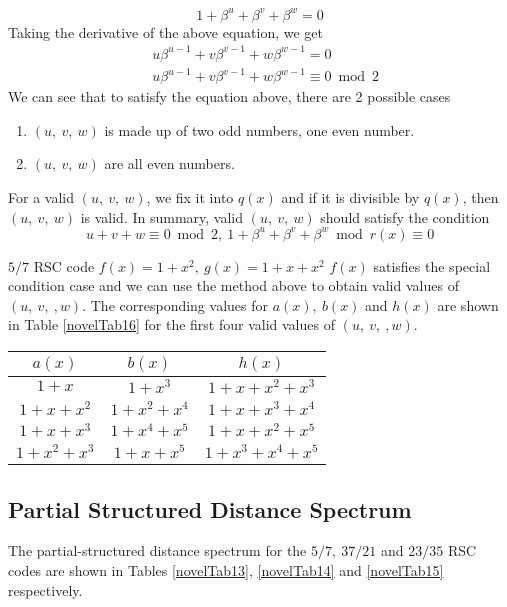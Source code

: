 $$1+\beta^{u}+\beta^{v}+\beta^{w} =0$$
Taking the derivative of the above equation, we get 
\begin{equation*}
\begin{split}
 &u\beta^{u-1}+v\beta^{v-1}+w\beta^{w-1} =0 \\
 & u\beta^{u-1}+v\beta^{v-1}+w\beta^{w-1} \equiv 0 \bmod 2
 \end{split}
 \end{equation*}
We can see that to satisfy the equation above, there are 2 possible cases
\begin{enumerate}
\item $(u,~v,~w)$ is made up of two odd numbers, one even number.
\item $(u,~v,~w)$ are all even numbers.
\end{enumerate}

For a valid $(u,~v,~w)$, we fix it into $q(x)$ and if it is divisible by $q(x)$, then $(u,~v,~w)$ is valid.
In summary, valid $(u,~v,~w)$ should satisfy the condition
$$u+v+w \equiv 0\bmod 2, ~1+\beta^{u}+\beta^{v}+\beta^{w} \bmod r(x) \equiv 0$$

\begin{example}
$5/7$ RSC code $f(x)=1+x^2,~g(x)=1+x+x^2$\newline
$f(x)$ satisfies the special condition case and we can use the method above to obtain valid values of $(u,~v,~,w)$. The corresponding values for $a(x),~b(x)$ and $h(x)$ are shown in Table \ref{novelTab16} for the first four valid values of $(u,~v,~,w)$.

 \begin{table*}[h]
 \caption{$5/7$ RSC, $f(x)=1+x^2,~w_H(\bh)=4$}
\centering
 \begin{tabular}{c c c} 
 \hline
 $a(x)$ & $b(x)$ & $h(x)$\\ [0.5ex] 
 \hline\hline
$1+x$ & $1+x^3$ & $1+x+x^2+x^3$\\ 
\hline
$1+x+x^2$ &  $1+x^2+x^4$ & $1+x+x^3+x^4$ \\
\hline
$1+x+x^3$ & $1+x^4+x^5$ & $1+x+x^2+x^5$\\
\hline
$1+x^2+x^3$ & $1+x+x^5$  &$1+x^3+x^4+x^5$
 \end{tabular}
 \label{novelTab16}
\end{table*}

\end{example}
\subsection{Partial Structured Distance Spectrum}
The partial-structured distance spectrum for the $5/7,~37/21$ and $23/35$ RSC codes are shown in Tables \ref{novelTab13},  \ref{novelTab14} and \ref{novelTab15} respectively. 

